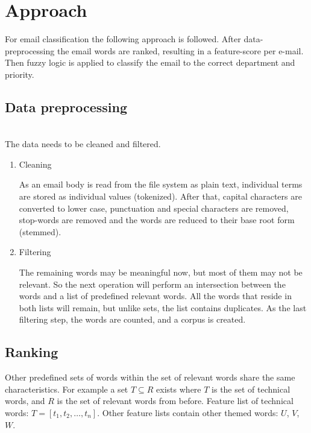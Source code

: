 \documentclass[journal]{IEEEtran}
\begin{document}
\section{Approach}
For email classification the following approach is followed. After data-preprocessing the email words are ranked, resulting in a feature-score per e-mail. Then fuzzy logic is applied to classify the email to the correct department and priority. 

\subsection{Data preprocessing}\\

The data needs to be cleaned and filtered.

\begin{enumerate}
    \item Cleaning
    
    As an email body is read from the file system as plain text, individual terms are stored as individual values (tokenized). After that, capital characters are converted to lower case, punctuation and special characters are removed, stop-words are removed and the words are reduced to their base root form (stemmed). 

    \item Filtering
    
    The remaining words may be meaningful now, but most of them may not be 
    relevant. So the next operation will perform an intersection between the 
    words and a list of predefined relevant words. All the words that reside 
    in both lists will remain, but unlike sets, the list contains duplicates.
    As the last filtering step, the words are counted, and a corpus is created.
    
\end{enumerate}
    
\subsection{Ranking}

    Other predefined sets of words within the set of relevant words share the 
    same characteristics. For example a set $T \subseteq R$ exists where $T$ 
    is the set of technical words, and $R$ is the set of relevant words from 
    before. Feature list of technical words: $T = [t_1, t_2, \dots, t_n]$. 
    Other feature lists contain other themed words: $U$, $V$, $W$.
\end{document}
